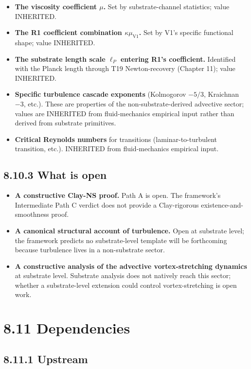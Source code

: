 \documentclass[11pt]{book}
\begin{document}
\begin{itemize}
\item \textbf{The viscosity coefficient $\mu$.} Set by substrate-channel statistics; value INHERITED.
\item \textbf{The R1 coefficient combination $\kappa\mu_{\mathrm{V1}}$.} Set by V1's specific functional shape; value INHERITED.
\item \textbf{The substrate length scale $\ell_P$ entering R1's coefficient.} Identified with the Planck length through T19 Newton-recovery (Chapter 11); value INHERITED.
\item \textbf{Specific turbulence cascade exponents} (Kolmogorov $-5/3$, Kraichnan $-3$, etc.). These are properties of the non-substrate-derived advective sector; values are INHERITED from fluid-mechanics empirical input rather than derived from substrate primitives.
\item \textbf{Critical Reynolds numbers} for transitions (laminar-to-turbulent transition, etc.). INHERITED from fluid-mechanics empirical input.
\end{itemize}

\subsection{8.10.3 What is open}

\begin{itemize}
\item \textbf{A constructive Clay-NS proof.} Path A is open. The framework's Intermediate Path C verdict does not provide a Clay-rigorous existence-and-smoothness proof.
\item \textbf{A canonical structural account of turbulence.} Open at substrate level; the framework predicts no substrate-level template will be forthcoming because turbulence lives in a non-substrate sector.
\item \textbf{A constructive analysis of the advective vortex-stretching dynamics} at substrate level. Substrate analysis does not natively reach this sector; whether a substrate-level extension could control vortex-stretching is open work.
\end{itemize}

\section{8.11 Dependencies}

\subsection{8.11.1 Upstream}
\end{document}
